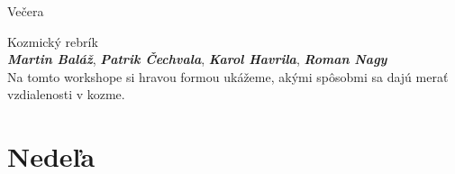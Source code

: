 \documentclass[a4paper]{report}
\begin{document}
                    \begin{tcolorbox}[
                                    colback=red!10,
                    colframe=red!50!black,
                                fonttitle=\Large\bfseries,
                title=19:00
            ]
                {\Large Večera}
                                            \end{tcolorbox}
                    \begin{tcolorbox}[
                                    colback=blue!10,
                    colframe=black!50!blue,
                                fonttitle=\Large\bfseries,
                title=20:00
            ]
                {\Large Kozmický rebrík}
                                                            \\                             \textit{\textbf{Martin Baláž}},                                                     \textit{\textbf{Patrik Čechvala}},                                                     \textit{\textbf{Karol Havrila}},                                                     \textit{\textbf{Roman Nagy}}                                                                                                \\[2ex]Na tomto workshope si hravou formou ukážeme, akými spôsobmi sa dajú merať vzdialenosti v kozme.
            \end{tcolorbox}
                    \section{Nedeľa}
\end{document}
